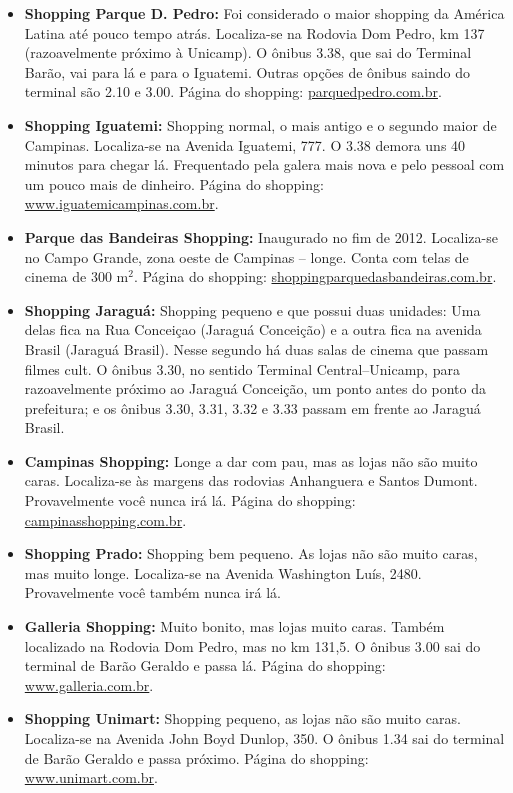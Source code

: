 \begin{itemize}

\item  \textbf{Shopping Parque D. Pedro:} Foi considerado o maior shopping da
    América Latina até pouco tempo atrás. Localiza-se na Rodovia Dom Pedro, km
    137 (razoavelmente próximo à Unicamp). O ônibus 3.38, que sai do Terminal
    Barão, vai para lá e para o Iguatemi. Outras opções de ônibus saindo do
    terminal são 2.10 e 3.00. Página do shopping: \url{parquedpedro.com.br}.

\item  \textbf{Shopping Iguatemi:} Shopping normal, o mais antigo e o segundo
    maior de Campinas. Localiza-se na Avenida Iguatemi, 777. O 3.38 demora uns
    40 minutos para chegar lá. Frequentado pela galera mais nova e pelo pessoal
    com um pouco mais de dinheiro. Página do shopping:
    \url{www.iguatemicampinas.com.br}.

\item \textbf{Parque das Bandeiras Shopping:} Inaugurado no fim de 2012.
    Localiza-se no Campo Grande, zona oeste de Campinas -- longe. Conta com
    telas de cinema de 300 m$^{2}$. Página do shopping:
    \url{shoppingparquedasbandeiras.com.br}.

\item  \textbf{Shopping Jaraguá:} Shopping pequeno e que possui duas unidades:
    Uma delas fica na Rua Conceiçao (Jaraguá Conceição) e a outra fica na
    avenida Brasil (Jaraguá Brasil). Nesse segundo há duas salas de cinema que
    passam filmes cult. O ônibus 3.30, no sentido Terminal Central--Unicamp,
    para razoavelmente próximo ao Jaraguá Conceição, um ponto antes do ponto da
    prefeitura; e os ônibus 3.30, 3.31, 3.32 e 3.33 passam em frente ao Jaraguá
    Brasil.

\item  \textbf{Campinas Shopping:} Longe a dar com pau, mas as lojas não são
    muito caras. Localiza-se às margens das rodovias Anhanguera e Santos Dumont.
    Provavelmente você nunca irá lá. Página do shopping:
    \url{campinasshopping.com.br}.

\item  \textbf{Shopping Prado:} Shopping bem pequeno. As lojas não são muito
    caras, mas muito longe. Localiza-se na Avenida Washington Luís, 2480.
    Provavelmente você também nunca irá lá.

\item  \textbf{Galleria Shopping:} Muito bonito, mas lojas muito caras. Também
    localizado na Rodovia Dom Pedro, mas no km 131,5. O ônibus 3.00 sai do
    terminal de Barão Geraldo e passa lá. Página do shopping:
    \url{www.galleria.com.br}.

\item  \textbf{Shopping Unimart:} Shopping pequeno, as lojas não são muito
    caras. Localiza-se na Avenida John Boyd Dunlop, 350. O ônibus 1.34 sai do
    terminal de Barão Geraldo e passa próximo. Página do shopping:
    \url{www.unimart.com.br}.

\end{itemize}
